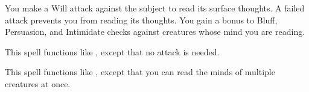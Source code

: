 \begin{comment}
\subsubsection{Q-R}
\end{comment}

\spelleffect You make a Will attack against the subject to read its surface thoughts. A failed attack prevents you from reading its thoughts. You gain a  bonus to Bluff, Persuasion, and Intimidate checks against creatures whose mind you are reading.

\spelleffect This spell functions like , except that no attack is needed.

\spelleffect This spell functions like , except that you can read the minds of multiple creatures at once. 

